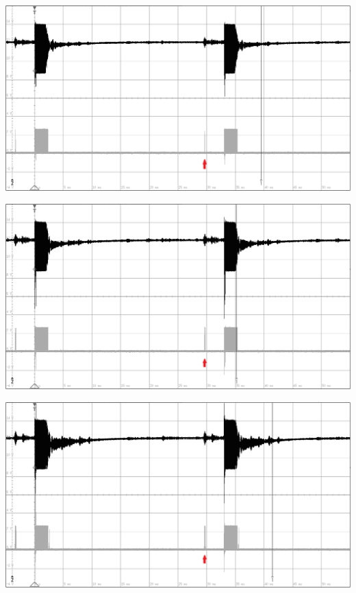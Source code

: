 \begin{minipage}{0.5\textwidth}
\includegraphics[width=1\textwidth%
]{Abbildungen/MessungenP2/10V/5mb.PNG}
\label{fig:10v5m}
\end{minipage}
\begin{minipage}{0.5\textwidth}
\includegraphics[width=1\textwidth%
]{Abbildungen/MessungenP2/15V/5mb.PNG}
\label{fig:15v5m}
\end{minipage}
\begin{minipage}{0.5\textwidth}
\includegraphics[width=1\textwidth%
]{Abbildungen/MessungenP2/20V/5mb.PNG}
\label{fig:20v5m}
\end{minipage}
